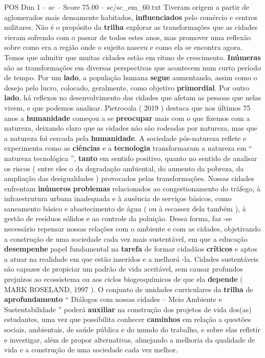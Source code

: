 \begin{textsample}{POS Dim 1 – sc – Score 75.00 – sc/sc\_em\_60.txt}
Tiveram origem a partir de aglomerados mais densamente habitados, \textbf{influenciados} pelo comércio e centros militares.
Não é o propósito da \textbf{trilha} explorar as transformações que as cidades vieram sofrendo com o passar de todos estes anos, mas promover uma reflexão sobre como era a região onde o sujeito nasceu e como ela se encontra agora.
Temos que admitir que muitas cidades estão em ritmo de crescimento. \textbf{Inúmeras} são as transformações em diversas perspectivas que acontecem num curto período de tempo.
Por um \textbf{lado}, a população humana \textbf{segue} aumentando, assim como o desejo pelo lucro, colocado, geralmente, como objetivo \textbf{primordial}.
Por outro \textbf{lado}, há reflexos no desenvolvimento das cidades que afetam as pessoas que nelas vivem, e que podemos analisar.
Pietrocola ( 2019 ) destaca que nos últimos 75 anos a \textbf{humanidade} começou a se \textbf{preocupar} mais com o que fizemos com a natureza, deixando claro que as cidades não são rodeadas por natureza, mas que a natureza foi cercada pela \textbf{humanidade}.
A sociedade pós-natureza reflete e experimenta como as \textbf{ciências} e a \textbf{tecnologia} transformaram a natureza em “ natureza tecnológica ”, \textbf{tanto} em sentido positivo, quanto no sentido de analisar os riscos ( entre eles o da degradação ambiental, do aumento da pobreza, da ampliação das desigualdades ) provocados pelas transformações.
Nossas cidades enfrentam \textbf{inúmeros} \textbf{problemas} relacionados ao congestionamento do tráfego, à infraestrutura urbana inadequada e à ausência de serviços básicos, como saneamento básico e abastecimento de água ( ou à escassez dela também ), à gestão de resíduos sólidos e ao controle da poluição.
Dessa forma, faz -se necessário repensar nossas relações com o ambiente e com as cidades, objetivando a construção de uma sociedade cada vez mais sustentável, em que a educação \textbf{desempenhe} papel fundamental na \textbf{tarefa} de formar cidadãos \textbf{críticos} e aptos a atuar na realidade em que estão inseridos e a melhorá -la.
Cidades sustentáveis são capazes de propiciar um padrão de vida aceitável, sem causar profundos prejuízos ao ecossistema ou aos ciclos biogeoquímicos de que ela \textbf{depende} ( MARK ROSELAND, 1997 ).
O conjunto de unidades curriculares da \textbf{trilha} de \textbf{aprofundamento} “ Diálogos com nossas cidades – Meio Ambiente e Sustentabilidade ” poderá \textbf{auxiliar} na construção dos projetos de vida dos(as) estudantes, uma vez que possibilita conhecer \textbf{caminhos} em relação a questões sociais, ambientais, de saúde pública e do mundo do trabalho, e sobre elas refletir e investigar, além de propor alternativas, almejando a melhoria da qualidade de vida e a construção de uma sociedade cada vez melhor.

\end{textsample}
